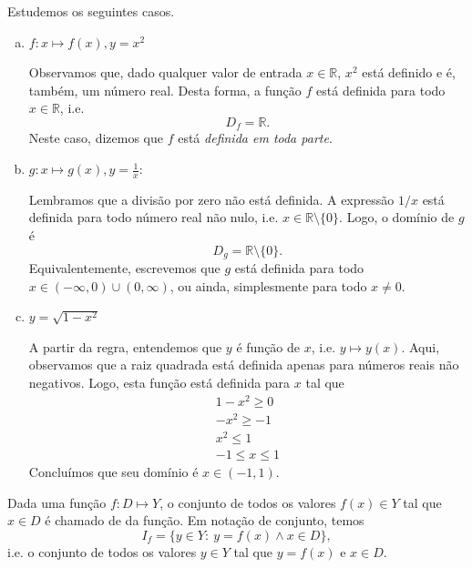 \begin{ex}\label{ex:funcao_defgrafico_dominio}
  Estudemos os seguintes casos.
  \begin{enumerate}[a)]
  \item $f:x\mapsto f(x), y=x^2$

    Observamos que, dado qualquer valor de entrada $x\in\mathbb{R}$, $x^2$ está definido e é, também, um número real. Desta forma, a função $f$ está definida para todo $x\in\mathbb{R}$, i.e.
    \begin{equation}
      D_f = \mathbb{R}.
    \end{equation}
    Neste caso, dizemos que $f$ está \emph{definida em toda parte}.

  \item $\displaystyle g:x\mapsto g(x), y=\frac{1}{x}$:

    Lembramos que a divisão por zero não está definida. A expressão $1/x$ está definida para todo número real não nulo, i.e. $x\in\mathbb{R}\setminus\{0\}$. Logo, o domínio de $g$ é
    \begin{equation}
      D_g = \mathbb{R}\setminus\{0\}.
    \end{equation}
    Equivalentemente, escrevemos que $g$ está definida para todo $x\in(-\infty,0)\cup(0,\infty)$, ou ainda, simplesmente para todo $x\neq 0$.

  \item $y=\sqrt{1-x^2}$

    A partir da regra, entendemos que $y$ é função de $x$, i.e. $y\mapsto y(x)$. Aqui, observamos que a raiz quadrada está definida apenas para números reais não negativos. Logo, esta função está definida para $x$ tal que
    \begin{gather}
      1-x^2 \geq 0\\
      -x^2 \geq -1\\
      x^2 \leq 1\\
      -1 \leq x \leq 1
    \end{gather}
    Concluímos que seu domínio é $x\in (-1, 1)$.
  \end{enumerate}
\end{ex}


Dada uma função $f:D\mapsto Y$, o conjunto de todos os valores $f(x)\in Y$ tal que $x\in D$ é chamado de  da função. Em notação de conjunto, temos
\begin{equation}
  I_f = \{y\in Y:~y=f(x)\land x\in D\},
\end{equation}
i.e. o conjunto de todos os valores $y\in Y$ tal que $y=f(x)$ e $x\in D$.

